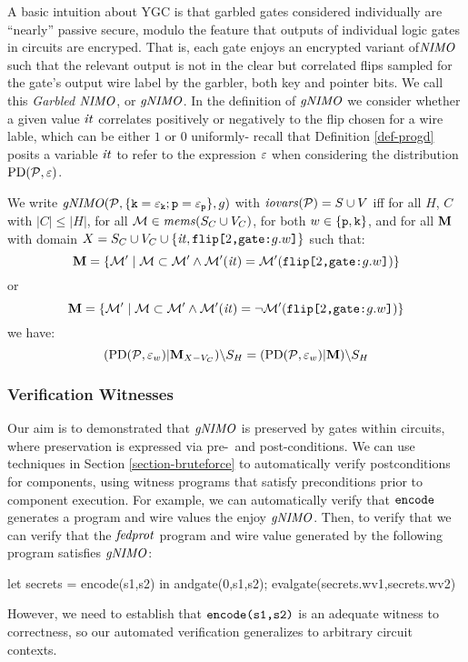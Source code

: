 A basic intuition about YGC is that garbled gates considered
individually are ``nearly'' passive secure, modulo the feature that
outputs of individual logic gates in circuits are encryped. That is,
each gate enjoys an encrypted variant of$\mathit{NIMO}$ such that the relevant
output is not in the clear but correlated flips sampled for the gate's
output wire label by the garbler, both key and pointer bits. We call
this \emph{Garbled $\mathit{NIMO}$}, or $\mathit{gNIMO}$. In the definition of
$\mathit{gNIMO}$ we consider whether a given value $\mathit{it}$ correlates
positively or negatively to the flip chosen for a wire lable, which
can be either $1$ or $0$ uniformly- recall that
Definition \ref{def-progd} posits a variable $\mathit{it}$ to refer to the
expression $\varepsilon$ when considering the distribution
$\mathrm{PD}(\mathcal{P},\varepsilon)$.
\begin{definition}
  We write $\mathit{gNIMO}(\mathcal{P},\{ \texttt{k} = \varepsilon_{\texttt{k}}; \texttt{p} =
  \varepsilon_{\texttt{p}}\}, g)$ with $\mathit{iovars}(\mathcal{P}) = S \cup V$ iff for all $H$,
  $C$ with $|C| \le |H|$, for all $\mathcal{M} \in \mathit{mems}(S_C \cup V_C)$,
  for both $w \in \{\texttt{p},\texttt{k}\}$, and for all $\mathbf{M}$ with
  domain $X = S_C \cup V_C \cup \{ \mathit{it}, \texttt{flip[}2\texttt{,}\texttt{gate:}g.w\texttt{]} \}$
  such that:
  $$
  \mathbf{M} = \{ \mathcal{M}' \mid \mathcal{M} \subset \mathcal{M}' \wedge 
  \mathcal{M}'(\mathit{it}) = \mathcal{M}'(\texttt{flip[}2\texttt{,}\texttt{gate:}g.w\texttt{]}) \} 
  $$
  or
  $$
  \mathbf{M} = \{ \mathcal{M}' \mid \mathcal{M} \subset \mathcal{M}' \wedge 
  \mathcal{M}'(\mathit{it}) = \neg\mathcal{M}'(\texttt{flip[}2\texttt{,}\texttt{gate:}g.w\texttt{]}) \} 
  $$
  we have:
  $$
  (\mathrm{PD}(\mathcal{P},\varepsilon_w)|\mathbf{M}_{X-{V_C}})\backslash S_H =
  (\mathrm{PD}(\mathcal{P},\varepsilon_w)|\mathbf{M})\backslash S_H
  $$
\end{definition}

\subsubsection{Verification Witnesses}

Our aim is to demonstrated that $\mathit{gNIMO}$ is preserved by gates within circuits,
where preservation is expressed via pre-~and post-conditions. We can use
techniques in Section \ref{section-bruteforce} to automatically verify postconditions
for components, using witness programs that satisfy preconditions prior to
component execution. For example, we can automatically verify that $\texttt{encode}$
generates a program and wire values the enjoy $\mathit{gNIMO}$. Then, to verify
that we can verify
that the $\mathit{fedprot}$ program and wire value generated by the following program satisfies
$\mathit{gNIMO}$:
\begin{verbatimtab}
  let secrets = encode(s1,s2) in
  andgate(0,s1,s2); evalgate(secrets.wv1,secrets.wv2)
\end{verbatimtab}
However, we need to establish that $\texttt{encode(s1,s2)}$ is an
adequate witness to correctness, so our automated verification generalizes to
arbitrary circuit contexts. 
  
